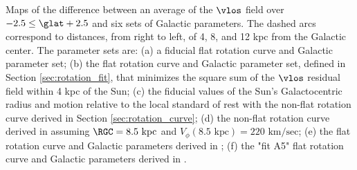 \label{fig:six_pies}
Maps of the difference between an average of the $\vlos$ field over $-2.5 \leq \glat +2.5$ and six sets of Galactic parameters. The dashed arcs correspond to distances, from right to left, of 4, 8, and 12 kpc from the Galactic center. The parameter sets are: (a) a fiducial flat rotation curve and Galactic parameter set; (b) the flat rotation curve and  Galactic parameter set, defined in Section \ref{sec:rotation_fit}, that minimizes the square sum of the $\vlos$ residual field within 4 kpc of the Sun; (c) the fiducial values of the Sun's Galactocentric radius and motion relative to the local standard of rest with the non-flat rotation curve derived in Section \ref{sec:rotation_curve}; (d) the non-flat rotation curve derived in \citet{Clemens:1985dp} assuming $\RGC=8.5 \text{ kpc}$ and $V_\phi(8.5 \text{ kpc})= 220\text{ km/sec}$; (e) the flat rotation curve and Galactic parameters derived in \citet{Bovy_2012}; (f) the "fit A5" flat rotation curve and Galactic parameters derived in \citet{Reid:2014km}. 